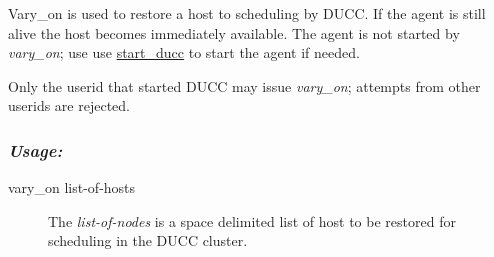     Vary\_on is used to restore a host to scheduling by DUCC.  If the agent is still
    alive the host becomes immediately available.  The agent is not started by
    {\em vary\_on}; use use 
    \hyperref[subsec:admin.start-ducc]{start\_ducc} to start the agent if needed.

    Only the userid that started DUCC may issue {\em vary\_on}; attempts from other userids
    are rejected.
    
    \subsubsection{\em{Usage: }}

        \begin{description} 
          \item[vary\_on list-of-hosts]
            The {\em list-of-nodes} is a space delimited list of host to be restored for
              scheduling in the DUCC cluster.
        \end{description}
            
       
